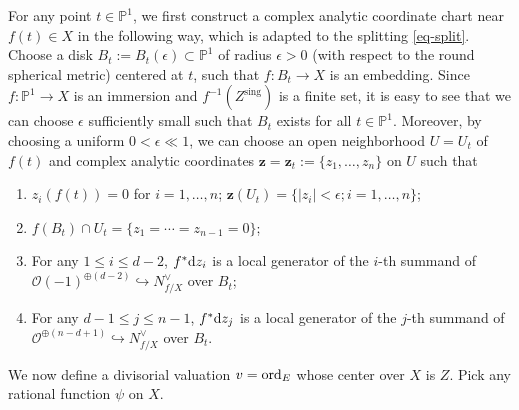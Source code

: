 \documentclass[12pt]{amsart}
\theoremstyle{definition}
\def\ord{{\rm ord}}
\def\dif{{\rm d}}
\def\ord{{\rm ord}}
\def\bz{{\mathbf{z}}}
\newcommand{\IP}{{\mathbb P}}
\newcommand{\CO}{{\mathcal O}}
\begin{document}
For any point $t\in \IP^1$, we first construct a complex analytic coordinate chart near $f(t)\in X$ in the following way, which is adapted to the splitting \eqref{eq-split}. 
Choose a disk $B_t:=B_t(\epsilon)\subset \IP^1$ of radius $\epsilon>0$ (with respect to the round spherical metric) centered at $t$, such that $f: B_t\rightarrow X$ is an embedding. Since $f: \IP^1\rightarrow X$ is an immersion and $f^{-1}(Z^{\mathrm{sing}})$ is a finite set, it is easy to see that we can choose $\epsilon$ sufficiently small such that $B_t$ exists for all $t\in \IP^1$. Moreover, by choosing a uniform $0<\epsilon\ll 1$, we can choose an open neighborhood $U=U_t$ of $f(t)$ and complex analytic coordinates $\bz=\bz_t:=\{z_1, \dots, z_n\}$ on $U$ such that 
\begin{enumerate}
    \item $z_i(f(t))=0$ for $i=1,\dots, n$; $\bz(U_t)=\{|z_i|<\epsilon; i=1, \dots, n\}$; 
    \item 
    $f(B_t)\cap U_t=\{z_1=\cdots=z_{n-1}=0\}$;
    \item For any $1\le i\le d-2$, $f^*\dif z_i$ is a local generator of the $i$-th summand of $\CO(-1)^{\oplus(d-2)}\hookrightarrow N^{\vee}_{f/X}$ over $B_t$;
    \item For any $d-1\le j\le n-1$, $f^*\dif z_j$ is a local generator of the $j$-th summand of $\CO^{\oplus(n-d+1)}\hookrightarrow N^{\vee}_{f/X}$ over $B_t$.    
\end{enumerate}
We now define a divisorial valuation $v=\ord_E$ whose center over $X$ is $Z$. Pick any rational function $\psi$ on $X$.
\end{document}
